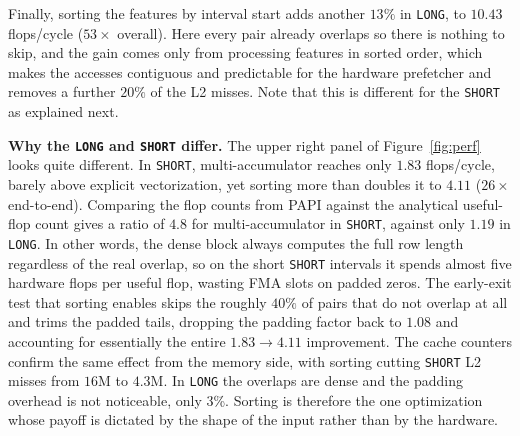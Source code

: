 \documentclass[letterpaper]{article}
\newcommand{\mypar}[1]{{\bf #1.}}
\begin{document}
Finally, sorting the features by interval start adds another $13\%$ in \texttt{LONG}, to $10.43$ flops/cycle ($53\times$ overall). Here every pair already overlaps so there is nothing to skip, and the gain comes only from processing features in sorted order, which makes the accesses contiguous and predictable for the hardware prefetcher and removes a further $20\%$ of the L2 misses. Note that this is different for the \texttt{SHORT} as explained next.

\mypar{Why the \texttt{LONG} and \texttt{SHORT} differ}
The upper right panel of Figure~\ref{fig:perf} looks quite different. In \texttt{SHORT}, multi-accumulator reaches only $1.83$ flops/cycle, barely above explicit vectorization, yet sorting more than doubles it to $4.11$ ($26\times$ end-to-end). Comparing the flop counts from PAPI against the analytical useful-flop count gives a ratio of $4.8$ for multi-accumulator in \texttt{SHORT}, against only $1.19$ in \texttt{LONG}. In other words, the dense block always computes the full row length regardless of the real overlap, so on the short \texttt{SHORT} intervals it spends almost five hardware flops per useful flop, wasting FMA slots on padded zeros. The early-exit test that sorting enables skips the roughly $40\%$ of pairs that do not overlap at all and trims the padded tails, dropping the padding factor back to $1.08$ and accounting for essentially the entire $1.83\to4.11$ improvement. The cache counters confirm the same effect from the memory side, with sorting cutting \texttt{SHORT} L2 misses from $16$M to $4.3$M. In \texttt{LONG} the overlaps are dense and the padding overhead is not noticeable, only 3\%. Sorting is therefore the one optimization whose payoff is dictated by the shape of the input rather than by the hardware.
\end{document}
